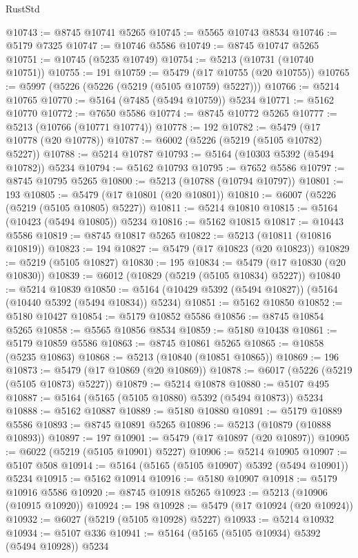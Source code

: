 \begin{lexlean}{RustStd}
\begin{coremodule}
@10743 := @8745 @10741 @5265
@10745 := @5565 @10743 @8534
@10746 := @5179 @7325
@10747 := @10746 @5586
@10749 := @8745 @10747 @5265
@10751 := @10745 (@5235 @10749)
@10754 := @5213 (@10731 (@10740 @10751))
@10755 := 191
@10759 := @5479 (@17 @10755 (@20 @10755))
@10765 := @5997 (@5226 (@5226 (@5219 (@5105 @10759) @5227)))
@10766 := @5214 @10765
@10770 := @5164 (@7485 (@5494 @10759)) @5234
@10771 := @5162 @10770
@10772 := @7650 @5586
@10774 := @8745 @10772 @5265
@10777 := @5213 (@10766 (@10771 @10774))
@10778 := 192
@10782 := @5479 (@17 @10778 (@20 @10778))
@10787 := @6002 (@5226 (@5219 (@5105 @10782) @5227))
@10788 := @5214 @10787
@10793 := @5164 (@10303 @5392 (@5494 @10782)) @5234
@10794 := @5162 @10793
@10795 := @7652 @5586
@10797 := @8745 @10795 @5265
@10800 := @5213 (@10788 (@10794 @10797))
@10801 := 193
@10805 := @5479 (@17 @10801 (@20 @10801))
@10810 := @6007 (@5226 (@5219 (@5105 @10805) @5227))
@10811 := @5214 @10810
@10815 := @5164 (@10423 (@5494 @10805)) @5234
@10816 := @5162 @10815
@10817 := @10443 @5586
@10819 := @8745 @10817 @5265
@10822 := @5213 (@10811 (@10816 @10819))
@10823 := 194
@10827 := @5479 (@17 @10823 (@20 @10823))
@10829 := @5219 (@5105 @10827)
@10830 := 195
@10834 := @5479 (@17 @10830 (@20 @10830))
@10839 := @6012 (@10829 (@5219 (@5105 @10834) @5227))
@10840 := @5214 @10839
@10850 := @5164 (@10429 @5392 (@5494 @10827)) (@5164 (@10440 @5392 (@5494 @10834)) @5234)
@10851 := @5162 @10850
@10852 := @5180 @10427
@10854 := @5179 @10852 @5586
@10856 := @8745 @10854 @5265
@10858 := @5565 @10856 @8534
@10859 := @5180 @10438
@10861 := @5179 @10859 @5586
@10863 := @8745 @10861 @5265
@10865 := @10858 (@5235 @10863)
@10868 := @5213 (@10840 (@10851 @10865))
@10869 := 196
@10873 := @5479 (@17 @10869 (@20 @10869))
@10878 := @6017 (@5226 (@5219 (@5105 @10873) @5227))
@10879 := @5214 @10878
@10880 := @5107 @495
@10887 := @5164 (@5165 (@5105 @10880) @5392 (@5494 @10873)) @5234
@10888 := @5162 @10887
@10889 := @5180 @10880
@10891 := @5179 @10889 @5586
@10893 := @8745 @10891 @5265
@10896 := @5213 (@10879 (@10888 @10893))
@10897 := 197
@10901 := @5479 (@17 @10897 (@20 @10897))
@10905 := @6022 (@5219 (@5105 @10901) @5227)
@10906 := @5214 @10905
@10907 := @5107 @508
@10914 := @5164 (@5165 (@5105 @10907) @5392 (@5494 @10901)) @5234
@10915 := @5162 @10914
@10916 := @5180 @10907
@10918 := @5179 @10916 @5586
@10920 := @8745 @10918 @5265
@10923 := @5213 (@10906 (@10915 @10920))
@10924 := 198
@10928 := @5479 (@17 @10924 (@20 @10924))
@10932 := @6027 (@5219 (@5105 @10928) @5227)
@10933 := @5214 @10932
@10934 := @5107 @336
@10941 := @5164 (@5165 (@5105 @10934) @5392 (@5494 @10928)) @5234

\end{coremodule}
\end{lexlean}
